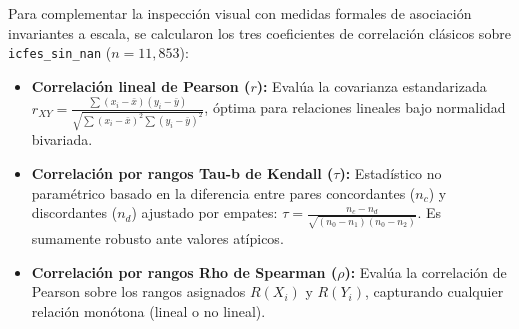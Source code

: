 \documentclass[11pt,letterpaper]{article}
\begin{document}
Para complementar la inspección visual con medidas formales de asociación invariantes a escala, se calcularon los tres coeficientes de correlación clásicos sobre \texttt{icfes\_sin\_nan} ($n = 11,853$):
\begin{itemize}
    \item \textbf{Correlación lineal de Pearson ($r$):} Evalúa la covarianza estandarizada $r_{XY} = \frac{\sum (x_i - \bar{x})(y_i - \bar{y})}{\sqrt{\sum (x_i - \bar{x})^2 \sum (y_i - \bar{y})^2}}$, óptima para relaciones lineales bajo normalidad bivariada.
    \item \textbf{Correlación por rangos Tau-b de Kendall ($\tau$):} Estadístico no paramétrico basado en la diferencia entre pares concordantes ($n_c$) y discordantes ($n_d$) ajustado por empates: $\tau = \frac{n_c - n_d}{\sqrt{(n_0 - n_1)(n_0 - n_2)}}$. Es sumamente robusto ante valores atípicos.
    \item \textbf{Correlación por rangos Rho de Spearman ($\rho$):} Evalúa la correlación de Pearson sobre los rangos asignados $R(X_i)$ y $R(Y_i)$, capturando cualquier relación monótona (lineal o no lineal).
\end{itemize}

\begin{table}[H]
\centering
\caption{Coeficientes de correlación de Pearson ($r$), Kendall ($\tau$) y Spearman ($\rho$) con \texttt{ESTU\_INSE\_INDIVIDUAL}.}
\label{tab:correlaciones}
\small
{}
\end{table}
\end{document}
